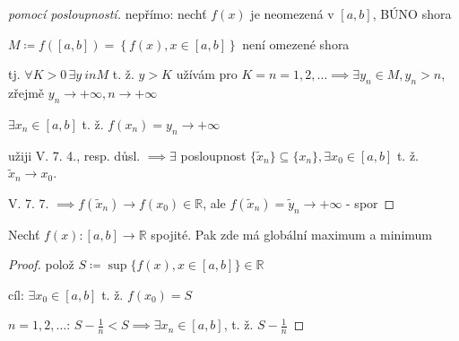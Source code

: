 \begin{proof}[pomocí posloupností]
  nepřímo: nechť $f(x)$ je neomezená v $[a,b]$, BÚNO shora

  $M \coloneq f([a, b]) = \left\{f(x), x \in [a, b]\right\}$ není omezené shora

  tj. $\forall K > 0 \,\exists y \ in M$ t. ž. $y > K$ užívám pro $K = n = 1, 2, \dots \implies \exists y_n \in M, y_n > n$, zřejmě $y_n \to + \infty, n \to + \infty$

  $\exists x_n \in [a,b]$ t. ž. $f(x_n) = y_n \to +\infty$

  užiji V. 7. 4., resp. důsl. $\implies \exists$ posloupnost $\{\tilde x_n\} \subseteq \{x_n\}, \exists x_0 \in [a,b]$ t. ž. $\tilde x_n \to x_0$.

  V. 7. 7. $\implies f(\tilde x_n) \to f(x_0) \in \mathbb R$, ale $f(\tilde x_n) = \tilde y_n \to + \infty$ - spor
\end{proof}

\begin{veta}[6.2.]
  Nechť $f(x): [a, b] \to \mathbb R$ spojité. Pak zde má globální maximum a minimum
\end{veta}
\begin{proof}
  polož $S \coloneq \sup\{f(x), x \in [a, b]\} \in \mathbb R$

  cíl: $\exists x_0 \in [a, b]$ t. ž. $f(x_0) = S$

  $n = 1, 2, \dots$: $S-\frac{1}{n}<S \implies \exists x_n \in [a, b]$, t. ž. $S-\frac{1}{n}$
\end{proof}

